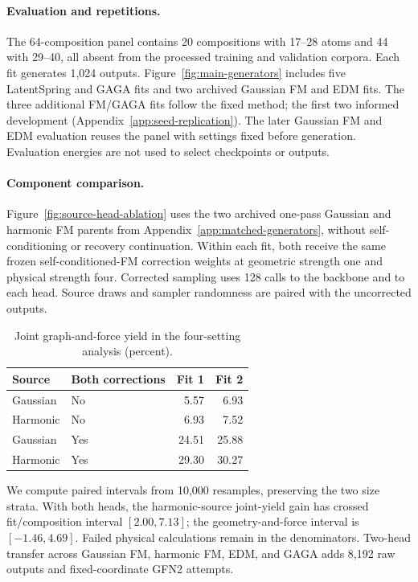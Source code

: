 \paragraph{Evaluation and repetitions.}
The 64-composition panel contains 20 compositions with 17--28 atoms and 44 with 29--40, all absent from the processed training and validation corpora. Each fit generates 1,024 outputs. Figure~\ref{fig:main-generators} includes five LatentSpring and GAGA fits and two archived Gaussian FM and EDM fits. The three additional FM/GAGA fits follow the fixed method; the first two informed development (Appendix~\ref{app:seed-replication}). The later Gaussian FM and EDM evaluation reuses the panel with settings fixed before generation. Evaluation energies are not used to select checkpoints or outputs.

\paragraph{Component comparison.}
Figure~\ref{fig:source-head-ablation} uses the two archived one-pass Gaussian and harmonic FM parents from Appendix~\ref{app:matched-generators}, without self-conditioning or recovery continuation. Within each fit, both receive the same frozen self-conditioned-FM correction weights at geometric strength one and physical strength four. Corrected sampling uses 128 calls to the backbone and to each head. Source draws and sampler randomness are paired with the uncorrected outputs.

\begin{table}[htbp]\centering\small
\caption{Joint graph-and-force yield in the four-setting analysis (percent).}
\begin{tabular}{llrr}\toprule
Source & Both corrections & Fit 1 & Fit 2\\\midrule
Gaussian & No & 5.57 & 6.93\\
Harmonic & No & 6.93 & 7.52\\
Gaussian & Yes & 24.51 & 25.88\\
Harmonic & Yes & 29.30 & 30.27\\
\bottomrule\end{tabular}\end{table}

We compute paired intervals from 10,000 resamples, preserving the two size strata. With both heads, the harmonic-source joint-yield gain has crossed fit/composition interval $[2.00,7.13]$; the geometry-and-force interval is $[-1.46,4.69]$. Failed physical calculations remain in the denominators. Two-head transfer across Gaussian FM, harmonic FM, EDM, and GAGA adds 8,192 raw outputs and fixed-coordinate GFN2 attempts.

